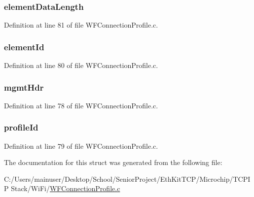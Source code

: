 \subsubsection[{element\+Data\+Length}]{ element\+Data\+Length}\label{structcp_element_response_struct_aea3027ceda8675b2b9d4341261c02814}


Definition at line 81 of file W\+F\+Connection\+Profile.\+c.

\hypertarget{structcp_element_response_struct_ae18351951739d45fe4aa49cb03e336c9}{}
\subsubsection[{element\+Id}]{ element\+Id}\label{structcp_element_response_struct_ae18351951739d45fe4aa49cb03e336c9}


Definition at line 80 of file W\+F\+Connection\+Profile.\+c.

\hypertarget{structcp_element_response_struct_a7267478e6419a759f2c5eaa97eaacab7}{}
\subsubsection[{mgmt\+Hdr}]{ mgmt\+Hdr}\label{structcp_element_response_struct_a7267478e6419a759f2c5eaa97eaacab7}


Definition at line 78 of file W\+F\+Connection\+Profile.\+c.

\hypertarget{structcp_element_response_struct_a642b6a0cbb1e521844300ab1ba775f98}{}
\subsubsection[{profile\+Id}]{ profile\+Id}\label{structcp_element_response_struct_a642b6a0cbb1e521844300ab1ba775f98}


Definition at line 79 of file W\+F\+Connection\+Profile.\+c.



The documentation for this struct was generated from the following file\+:\begin{DoxyCompactItemize}
\item 
C\+:/\+Users/mainuser/\+Desktop/\+School/\+Senior\+Project/\+Eth\+Kit\+T\+C\+P/\+Microchip/\+T\+C\+P\+I\+P Stack/\+Wi\+Fi/\hyperlink{_w_f_connection_profile_8c}{W\+F\+Connection\+Profile.\+c}\end{DoxyCompactItemize}
